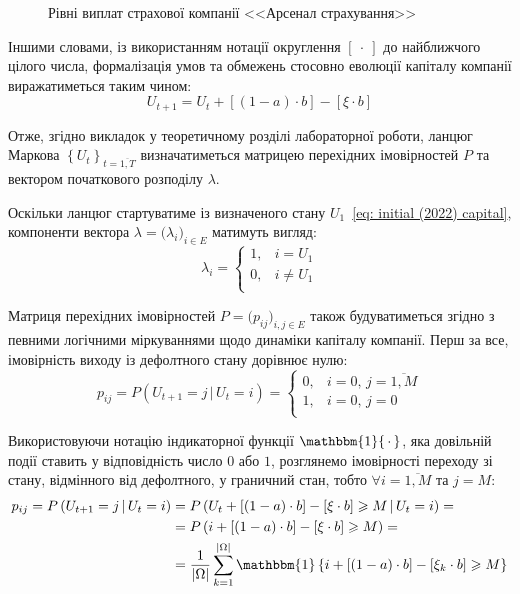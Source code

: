 \documentclass{mathreport}
\begin{document}
\begin{figure}[H]\centering
    
    \caption{Рівні виплат страхової компанії <<Арсенал страхування>>}
    \label{pic: annual payout levels}
\end{figure}

Іншими словами, із використанням нотації округлення $[\ \cdot\ ]$ до найближчого цілого числа, формалізація умов та обмежень стосовно еволюції капіталу компанії виражатиметься таким чином:
\begin{equation}\label{eq: edited capital evolution}
    U_{t+1} = U_{t} + [(1-a) \cdot b] - [\xi \cdot b]
\end{equation}

Отже, згідно викладок у теоретичному розділі лабораторної роботи, ланцюг Маркова $\left\{ U_t \right\}_{t=\overline{1,T}}$ визначатиметься матрицею перехідних імовірностей $P$ та вектором початкового розподілу $\lambda$. 

Оскільки ланцюг стартуватиме із визначеного стану $U_1$~\eqref{eq: initial (2022) capital}, компоненти вектора $\lambda = \bigl( \lambda_i \bigr)_{i \in E}$ матимуть вигляд:
\begin{equation}\label{eq: set initial distribution}
    \lambda_i = 
    \begin{cases}
        1, & i = U_1 \\
        0, & i\neq U_1 \\
    \end{cases}
\end{equation}

Матриця перехідних імовірностей $P = \bigl( p_{ij} \bigr)_{i,j \in E}$ також будуватиметься згідно з певними логічними міркуваннями щодо динаміки капіталу компанії. Перш за все, імовірність виходу із дефолтного стану дорівнює нулю:  
\begin{equation}\label{eq: i=0 transition matrix}
    p_{ij} = P\left( U_{t+1}=j \,|\, U_{t}=i \right) = 
    \begin{cases}
        0, & i=0,\, j=\overline{1,M} \\
        1, & i=0,\, j=0 \\
    \end{cases}
\end{equation} 

Використовуючи нотацію індикаторної функції $\mathbbm{1}\{ \, \cdot \, \}$, яка довільній події ставить у відповідність число $0$ або $1$, розглянемо імовірності переходу зі стану, відмінного від дефолтного, у граничний стан, тобто $\forall i=\overline{1,M}$ та $j=M:$
\begin{align}\label{eq: j=M transition matrix}
    p_{ij} = P\left( U_{t+1}=j \,|\, U_{t}=i \right) & = P\left( U_{t} + [(1-a) \cdot b] - [\xi \cdot b] \geqslant M \,|\, U_{t}=i \right) = \notag \\
    & = P\left( i + [(1-a) \cdot b] - [\xi \cdot b] \geqslant M \right) = \notag \\
    & = \frac{1}{|\Omega|}\sum\limits_{k=1}^{|\Omega|}\mathbbm{1}\left\{ i + [(1-a) \cdot b] - [\xi_k \cdot b] \geqslant M \right\}
\end{align} 
\end{document}

